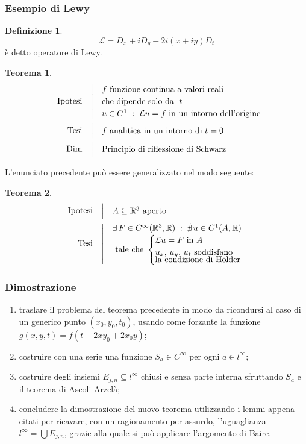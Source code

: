 \documentclass[serif,notheorems]{beamer}
\makeatletter
\newenvironment{ipotesi}%
{\quad\left|\quad\def\arraystretch{1.2}\begin{array}{@{}l@{}}}%
{\end{array}\right.}
\newcommand{\hpth}[2]
{
\begin{align*}
\quad
\text{Ipotesi}
&\begin{ipotesi}
#1
\end{ipotesi}\\
\text{Tesi}
&\begin{ipotesi}
#2
\end{ipotesi}
\end{align*}
}
\newcommand{\hpthdim}[3]
{
\begin{align*}
\quad
\text{Ipotesi}
&\begin{ipotesi} 
#1
\end{ipotesi}\\
\text{Tesi}
&\begin{ipotesi}
#2
\end{ipotesi}\\
\text{Dim}
&\begin{ipotesi}
#3
\end{ipotesi}
\end{align*}
}
\theoremstyle{definition} %
\newtheorem{theorem}{Teorema}[section] %
\newtheorem{definition}{Definizione}[section] %
\theoremstyle{remark}
\makeatother
\begin{document}
\begin{frame}
\frametitle{Esempio di Lewy}
\begin{definition}
$$\mathcal{L}=D_x+iD_y-2i(x+iy)D_t$$
è detto operatore di Lewy.
\end{definition}
\end{frame}

\begin{frame}
\begin{theorem}
\hpthdim{
f \text{ funzione continua a valori reali}\\ 
\text{che dipende solo da } \; t\\
u\in C^1\;:\;\mathcal{L}u=f \text{ in un intorno dell'origine }
}
{f \text{ analitica in un intorno di } t=0}{
\text{Principio di riflessione di Schwarz}
}
\end{theorem}
\end{frame}

\begin{frame}
L'enunciato precedente può essere generalizzato nel modo seguente:
\begin{theorem}
\hpth{
A \subseteq \mathbb{R}^3 \text{ aperto }\\
}
{
\exists \, F \in C^{\infty}(\mathbb{R}^3,\mathbb{R}) \; : \; \nexists \, u \in C^1(A,\mathbb{R}) \\ \text{ tale che }
\begin{cases}
\mathcal{L}u=F \text{ in } A\\
\vspace{-2mm}
u_x,\,u_y,\,u_t \text{ soddisfano} \\
\text {la condizione di Hölder }
\end{cases}
}
\end{theorem}
\end{frame}

\begin{frame}
\frametitle{Dimostrazione}
\begin{enumerate}
\item
traslare il problema del teorema precedente in modo da ricondursi al caso di un generico punto $(x_0,y_0,t_0)$, usando come forzante la funzione $g(x,y,t)=f(t-2xy_0+2x_0y)$;
\item
costruire con una serie una funzione $S_a \in C^\infty$ per ogni $a \in l^\infty$;
\item
costruire degli insiemi $E_{j,n} \subseteq l^\infty$ chiusi e senza parte interna sfruttando $S_a$ e il teorema di Ascoli-Arzelà;
\item
concludere la dimostrazione del nuovo teorema utilizzando i lemmi appena citati per ricavare, con un ragionamento per assurdo, l'uguaglianza $l^\infty = \bigcup E_{j,n}$, grazie alla quale si può applicare l'argomento di Baire.
\end{enumerate}
\end{frame}
\end{document}
